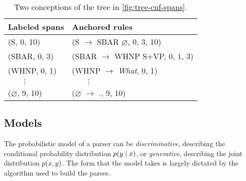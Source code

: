     \begin{table}[h]
      \center
      \small
      \bgroup  %
      \def\arraystretch{1.5}  %
      \begin{tabular}{l|l}
        Labeled spans & Anchored rules \\
        \hline
        (S, 0, 10)     & (S $\to$ SBAR $\varnothing$, 0, 3, 10)  \\
        (SBAR, 0, 3)   & (SBAR $\to$ WHNP S+VP, 0, 1, 3)  \\
        (WHNP, 0, 1)     & (WHNP $\to$ \textit{What}, 0, 1)  \\
        $\qquad\vdots$ & $\qquad\vdots$  \\
        ($\varnothing$, 9, 10)     & ($\varnothing$ $\to$ ., 9, 10)  \\
      \end{tabular}
      \caption{Two conceptions of the tree in \ref{fig:tree-cnf-spans}.}
      \label{tab:spans-rules}
      \egroup  %
    \end{table}


  \subsection{Models}
    The probabilistic model of a parser can be \textit{discriminative}, describing the conditional probability distribution $p(y \mid x)$, or \textit{generative}, describing the joint distribution $p(x, y)$. The form that the model takes is largely dictated by the algorithm used to build the parses.

